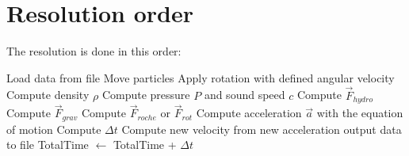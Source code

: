 \documentclass[notes.tex]{subfiles}
\begin{document}
\section{Resolution order}
\label{sec:reso}

The resolution is done in this order:\\

\begin{algorithmic}
\State Load data from file
\State Move particles
\State Apply rotation with defined angular velocity
\State Compute density $\rho$
\State Compute pressure $P$ and sound speed $c$
\State Compute $\vec{F}_{hydro}$
\State Compute $\vec{F}_{grav}$
\State Compute $\vec{F}_{roche}$ or $\vec{F}_{rot}$
\EndIf
\State Compute acceleration $\vec{a}$ with the equation of motion
\State Compute $\Delta t$
\State Compute new velocity from new acceleration
\State output data to file
\EndIf
\State TotalTime $\leftarrow$ TotalTime + $\Delta t$
\EndWhile
\end{algorithmic}
\end{document}
